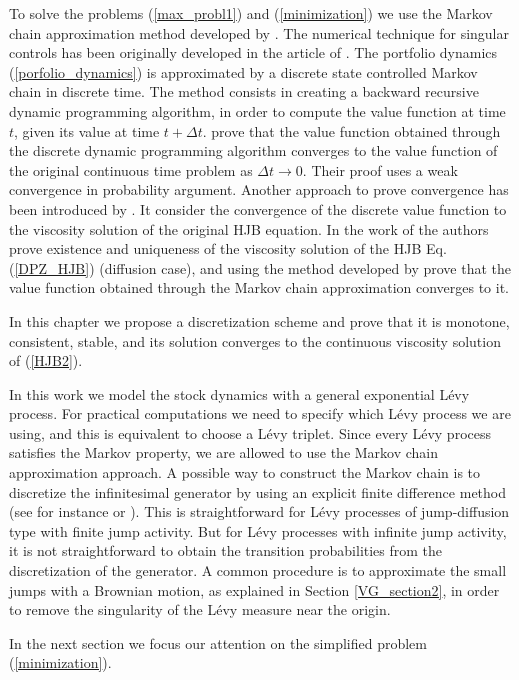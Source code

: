 To solve the problems (\ref{max_probl1}) and (\ref{minimization}) we use the Markov chain approximation method developed by \cite{Kushner}.
The numerical technique for singular controls has been originally developed in the article of \cite{MaKu91}.
The portfolio dynamics (\ref{porfolio_dynamics}) is approximated by a discrete state controlled Markov chain in discrete time. 
The method consists in creating a backward recursive 
dynamic programming algorithm, in order to compute the value function at time $t$, given its value at time $t+\Delta t$.
\cite{Kushner} prove that the value function obtained through the discrete dynamic programming algorithm converges to 
the value function of the original continuous time problem as $\Delta t \to 0$. 
Their proof uses a weak convergence in probability argument.
Another approach to prove convergence has been introduced by \cite{BaSo91}. It consider the convergence of the discrete value function to the viscosity solution of the 
original HJB equation.
In the work of \cite{DaPaZa93} the authors prove existence and uniqueness of the viscosity solution
of the HJB Eq. (\ref{DPZ_HJB}) (diffusion case), and using the method developed by \cite{BaSo91} prove 
that the value function obtained through the Markov chain approximation converges to it.

In this chapter we propose a discretization scheme and prove that it is monotone, consistent, stable, and its solution converges to the continuous viscosity
solution of (\ref{HJB2}).

In this work we model the stock dynamics with a general exponential Lévy process. For practical computations we need to specify
which Lévy process we are using, and this is equivalent to choose a Lévy triplet.
Since every L\'evy process satisfies the Markov property, we are allowed to use the Markov chain approximation approach.  
A possible way to construct the Markov chain is to discretize the infinitesimal generator by using an explicit finite difference method
(see for instance \cite{Kushner} or \cite{FlemingSoner}).
This is straightforward for 
Lévy processes of jump-diffusion type with finite jump activity. 
But for Lévy processes with infinite jump activity, it is not straightforward to obtain the transition probabilities from the discretization of the generator.
A common procedure is to approximate the small jumps with a Brownian motion, as explained in Section \ref{VG_section2}, in order to remove
the singularity of the Lévy measure near the origin. 

\noindent
In the next section we focus our attention on the simplified problem (\ref{minimization}). 


